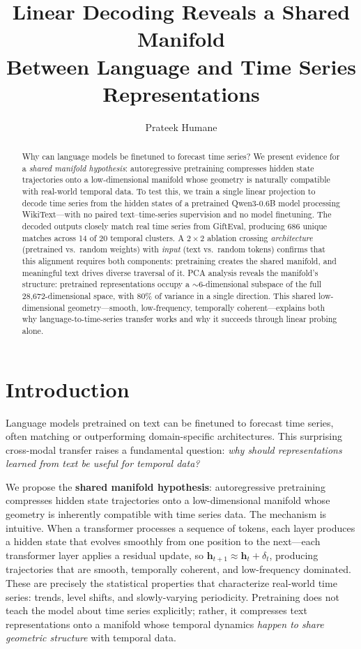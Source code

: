 \documentclass[11pt,a4paper]{article}
\title{Linear Decoding Reveals a Shared Manifold\\Between Language and Time Series Representations}
\author{Prateek Humane}
\date{}
\begin{document}
\maketitle

\begin{abstract}
Why can language models be finetuned to forecast time series?
We present evidence for a \textit{shared manifold hypothesis}: autoregressive pretraining compresses hidden state trajectories onto a low-dimensional manifold whose geometry is naturally compatible with real-world temporal data.
To test this, we train a single linear projection to decode time series from the hidden states of a pretrained Qwen3-0.6B model processing WikiText---with no paired text--time-series supervision and no model finetuning.
The decoded outputs closely match real time series from GiftEval, producing 686 unique matches across 14 of 20 temporal clusters.
A $2\times 2$ ablation crossing \textit{architecture} (pretrained vs.\ random weights) with \textit{input} (text vs.\ random tokens) confirms that this alignment requires both components: pretraining creates the shared manifold, and meaningful text drives diverse traversal of it.
PCA analysis reveals the manifold's structure: pretrained representations occupy a $\sim$6-dimensional subspace of the full 28{,}672-dimensional space, with 80\% of variance in a single direction.
This shared low-dimensional geometry---smooth, low-frequency, temporally coherent---explains both why language-to-time-series transfer works and why it succeeds through linear probing alone.
\end{abstract}

\section{Introduction}

Language models pretrained on text can be finetuned to forecast time series, often matching or outperforming domain-specific architectures. This surprising cross-modal transfer raises a fundamental question: \textit{why should representations learned from text be useful for temporal data?}

We propose the \textbf{shared manifold hypothesis}: autoregressive pretraining compresses hidden state trajectories onto a low-dimensional manifold whose geometry is inherently compatible with time series data. The mechanism is intuitive. When a transformer processes a sequence of tokens, each layer produces a hidden state that evolves smoothly from one position to the next---each transformer layer applies a residual update, so $\mathbf{h}_{t+1} \approx \mathbf{h}_t + \delta_t$, producing trajectories that are smooth, temporally coherent, and low-frequency dominated. These are precisely the statistical properties that characterize real-world time series: trends, level shifts, and slowly-varying periodicity. Pretraining does not teach the model about time series explicitly; rather, it compresses text representations onto a manifold whose temporal dynamics \textit{happen to share geometric structure} with temporal data.
\end{document}
